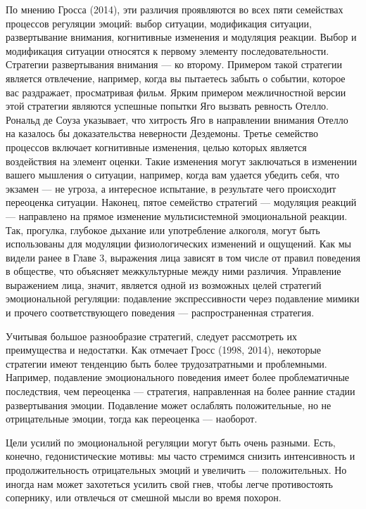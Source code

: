 \documentclass[11pt]{book}
\begin{document}
По мнению Гросса (2014), эти различия проявляются во всех пяти семействах процессов регуляции эмоций: выбор ситуации, модификация ситуации, развертывание внимания, когнитивные изменения и модуляция реакции. Выбор и модификация ситуации относятся к первому элементу последовательности. Стратегии развертывания внимания --- ко второму. Примером такой стратегии является отвлечение, например, когда вы пытаетесь забыть о событии, которое вас раздражает, просматривая фильм. Ярким примером межличностной версии этой стратегии являются успешные попытки Яго вызвать ревность Отелло. Рональд де Соуза указывает, что хитрость Яго в направлении внимания Отелло на казалось бы доказательства неверности Дездемоны. Третье семейство процессов включает когнитивные изменения, целью которых является воздействия на элемент оценки. Такие изменения могут заключаться в изменении вашего мышления о ситуации, например, когда вам удается убедить себя, что экзамен --- не угроза, а интересное испытание, в результате чего происходит переоценка ситуации. Наконец, пятое семейство стратегий --- модуляция реакций --- направлено на прямое изменение мультисистемной эмоциональной реакции. Так, прогулка, глубокое дыхание или употребление алкоголя, могут быть использованы для модуляции физиологических изменений и ощущений. Как мы видели ранее в Главе 3, выражения лица зависят в том числе от правил поведения в обществе, что объясняет межкультурные между ними различия. Управление выражением лица, значит, является одной из возможных целей стратегий эмоциональной регуляции: подавление экспрессивности через подавление мимики и прочего соответствующего поведения --- распространенная стратегия.

Учитывая большое разнообразие стратегий, следует рассмотреть их преимущества и недостатки. Как отмечает Гросс (1998, 2014), некоторые стратегии имеют тенденцию быть более трудозатратными и проблемными. Например, подавление эмоционального поведения имеет более проблематичные последствия, чем переоценка --- стратегия, направленная на более ранние стадии развертывания эмоции. Подавление может ослаблять положительные, но не отрицательные эмоции, тогда как переоценка --- наоборот.

Цели усилий по эмоциональной регуляции могут быть очень разными. Есть, конечно, гедонистические мотивы: мы часто стремимся снизить интенсивность и продолжительность отрицательных эмоций и увеличить --- положительных. Но иногда нам может захотеться усилить свой гнев, чтобы легче противостоять сопернику, или отвлечься от смешной мысли во время похорон.
\end{document}
